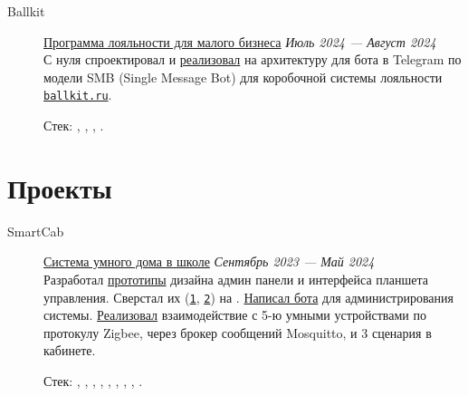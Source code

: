 \documentclass[margin,line]{resume}
\begin{document}
\begin{resume}
  \begin{description}

      \item[Ballkit]\small\href{https://github.com/ballkit}{Программа лояльности для малого бизнеса} \hfill
      \textsl{Июль 2024 — Август 2024\vspace{1mm}}\\
      С нуля спроектировал и \href{https://github.com/ballkit/ballkit-platform}{реализовал} на  архитектуру для бота в Telegram по модели SMB (Single Message Bot) для коробочной системы лояльности
      \href{https://ballkit.ru}{\texttt{ballkit.ru}}. 

      Стек:
      ,
      , ,
      .
  \end{description}

  \section{\mysidestyle Проекты}\vspace{2mm}

  \begin{description}

    \item[SmartCab]\small{\href{https://github.com/smart-cab}{Система
        умного дома в школе} \hfill
      \textsl{Сентябрь 2023 — Май 2024\vspace{1mm}}}\\
      Разработал
      \href{https://www.figma.com/design/8H1tFpxgmIDV1xp06ndi73/SmartCab?node-id=0-1&p=f}{прототипы}
      дизайна админ панели и интерфейса планшета управления. 
      Сверстал их
      (\texttt{\href{https://github.com/smart-cab/smartcab-hub/tree/main/frontend/src}{1}},
      \texttt{\href{https://github.com/smart-cab/smartcab-dashboard/tree/main/frontend/src}{2}})
      на .
      \href{https://github.com/smart-cab/smartcab-bot}{Написал бота}
      для администрирования системы.
      \href{https://github.com/smart-cab/smartcab-hub/blob/main/backend/smartcab/interface/mqtt.py}{Реализовал}
      взаимодействие с 5-ю умными устройствами по протокулу Zigbee, через
      брокер сообщений Mosquitto, и 3 сценария в кабинете.

      Стек:
      , ,
      , ,
      ,
      , ,
      , .
      \vspace{3mm}


\end{description}
\end{resume}
\end{document}
